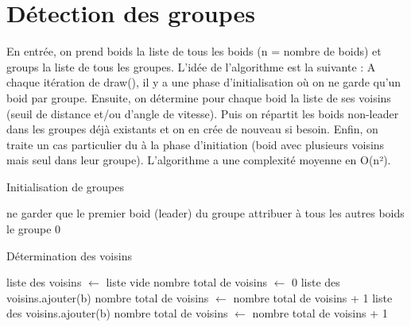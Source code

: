 \documentclass{article}
\begin{document}
\section{Détection des groupes}

En entrée, on prend boids la liste de tous les boids (n = nombre de boids) et groups
la liste de tous les groupes. L’idée de l’algorithme est la suivante : A chaque itération de
draw(), il y a une phase d'initialisation où on ne garde qu’un boid par groupe. Ensuite,
on détermine pour chaque boid la liste de ses voisins (seuil de distance et/ou d'angle de
vitesse). Puis on répartit les boids non-leader dans les groupes déjà existants et on en
crée de nouveau si besoin. Enfin, on traite un cas particulier du à la phase d'initiation
(boid avec plusieurs voisins mais seul dans leur groupe).
L’algorithme a une complexité moyenne en O(n²).

\begin{algorithm}[H]
    \caption{Initialisation de groupes}
    \begin{algorithmic}
        \STATE ne garder que le premier boid (leader) du groupe
        \STATE attribuer à tous les autres boids le groupe 0
        \ENDFOR

    \end{algorithmic}
\end{algorithm}

\begin{algorithm}[H]
    \caption{Détermination des voisins}
    \begin{algorithmic}
        \STATE liste des voisins $\leftarrow$ liste vide
        \STATE nombre total de voisins $\leftarrow$ 0
        \STATE liste des voisins.ajouter(b)
        \STATE nombre total de voisins $\leftarrow$ nombre total de voisins + 1
        \ENDIF
        \ELSE
        \STATE liste des voisins.ajouter(b)
        \STATE nombre total de voisins $\leftarrow$ nombre total de voisins + 1
        \ENDIF
        \ENDIF
        \ENDFOR
        \ENDFOR

    \end{algorithmic}
\end{algorithm}
\end{document}
